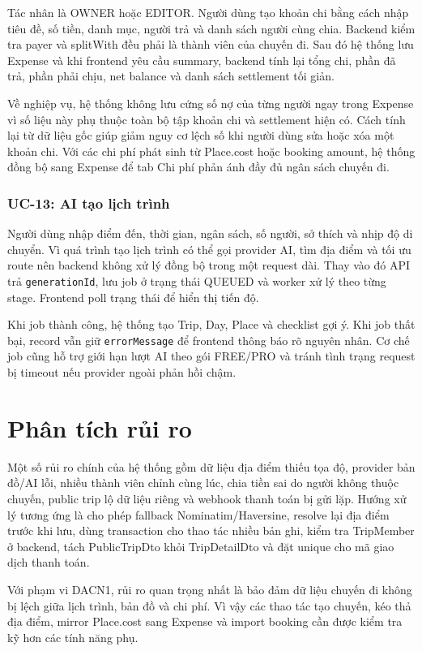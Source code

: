 \documentclass[a4paper]{report}
\begin{document}
Tác nhân là OWNER hoặc EDITOR. Người dùng tạo khoản chi bằng cách nhập tiêu đề, số tiền, danh mục, người trả và danh sách người cùng chia. Backend kiểm tra payer và splitWith đều phải là thành viên của chuyến đi. Sau đó hệ thống lưu Expense và khi frontend yêu cầu summary, backend tính lại tổng chi, phần đã trả, phần phải chịu, net balance và danh sách settlement tối giản.

Về nghiệp vụ, hệ thống không lưu cứng số nợ của từng người ngay trong Expense vì số liệu này phụ thuộc toàn bộ tập khoản chi và settlement hiện có. Cách tính lại từ dữ liệu gốc giúp giảm nguy cơ lệch số khi người dùng sửa hoặc xóa một khoản chi. Với các chi phí phát sinh từ Place.cost hoặc booking amount, hệ thống đồng bộ sang Expense để tab Chi phí phản ánh đầy đủ ngân sách chuyến đi.

\subsubsection{UC-13: AI tạo lịch trình}

Người dùng nhập điểm đến, thời gian, ngân sách, số người, sở thích và nhịp độ di chuyển. Vì quá trình tạo lịch trình có thể gọi provider AI, tìm địa điểm và tối ưu route nên backend không xử lý đồng bộ trong một request dài. Thay vào đó API trả \texttt{generationId}, lưu job ở trạng thái QUEUED và worker xử lý theo từng stage. Frontend poll trạng thái để hiển thị tiến độ.

Khi job thành công, hệ thống tạo Trip, Day, Place và checklist gợi ý. Khi job thất bại, record vẫn giữ \texttt{errorMessage} để frontend thông báo rõ nguyên nhân. Cơ chế job cũng hỗ trợ giới hạn lượt AI theo gói FREE/PRO và tránh tình trạng request bị timeout nếu provider ngoài phản hồi chậm.

\section{Phân tích rủi ro}

Một số rủi ro chính của hệ thống gồm dữ liệu địa điểm thiếu tọa độ, provider bản đồ/AI lỗi, nhiều thành viên chỉnh cùng lúc, chia tiền sai do người không thuộc chuyến, public trip lộ dữ liệu riêng và webhook thanh toán bị gửi lặp. Hướng xử lý tương ứng là cho phép fallback Nominatim/Haversine, resolve lại địa điểm trước khi lưu, dùng transaction cho thao tác nhiều bản ghi, kiểm tra TripMember ở backend, tách PublicTripDto khỏi TripDetailDto và đặt unique cho mã giao dịch thanh toán.

Với phạm vi DACN1, rủi ro quan trọng nhất là bảo đảm dữ liệu chuyến đi không bị lệch giữa lịch trình, bản đồ và chi phí. Vì vậy các thao tác tạo chuyến, kéo thả địa điểm, mirror Place.cost sang Expense và import booking cần được kiểm tra kỹ hơn các tính năng phụ.
\end{document}
